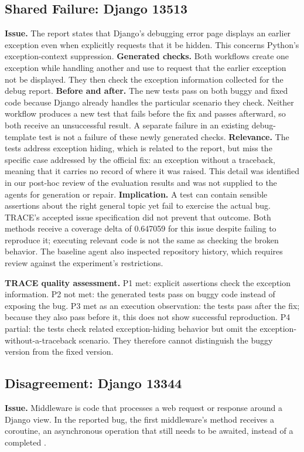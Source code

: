 \subsection{Shared Failure: Django 13513}
\textbf{Issue.} The report states that Django's debugging error page displays an earlier exception even when  explicitly requests that it be hidden. This concerns Python's exception-context suppression. \textbf{Generated checks.} Both workflows create one exception while handling another and use  to request that the earlier exception not be displayed. They then check the exception information collected for the debug report. \textbf{Before and after.} The new tests pass on both buggy and fixed code because Django already handles the particular scenario they check. Neither workflow produces a new test that fails before the fix and passes afterward, so both receive an unsuccessful result. A separate failure in an existing debug-template test is not a failure of these newly generated checks. \textbf{Relevance.} The tests address exception hiding, which is related to the report, but miss the specific case addressed by the official fix: an exception without a traceback, meaning that it carries no record of where it was raised. This detail was identified in our post-hoc review of the evaluation results and was not supplied to the agents for generation or repair. \textbf{Implication.} A test can contain sensible assertions about the right general topic yet fail to exercise the actual bug. TRACE's accepted issue specification did not prevent that outcome. Both methods receive a coverage delta of 0.647059 for this issue despite failing to reproduce it; executing relevant code is not the same as checking the broken behavior. The baseline agent also inspected repository history, which requires review against the experiment's restrictions.

\textbf{TRACE quality assessment.} P1 met: explicit assertions check the exception information. P2 not met: the generated tests pass on buggy code instead of exposing the bug. P3 met as an execution observation: the tests pass after the fix; because they also pass before it, this does not show successful reproduction. P4 partial: the tests check related exception-hiding behavior but omit the exception-without-a-traceback scenario. They therefore cannot distinguish the buggy version from the fixed version.

\subsection{Disagreement: Django 13344}
\textbf{Issue.} Middleware is code that processes a web request or response around a Django view. In the reported bug, the first middleware's  method receives a coroutine, an asynchronous operation that still needs to be awaited, instead of a completed .


